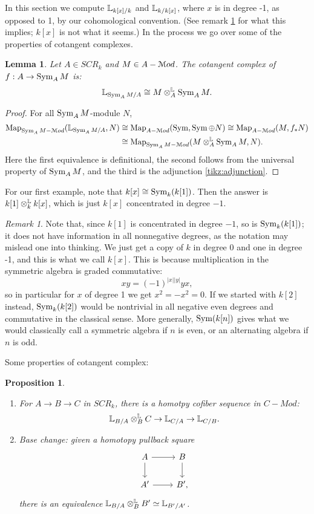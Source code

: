 \documentclass[10pt,a4paper,reqno,oneside]{book} %
\theoremstyle{plain}
\newtheorem{lem}[thm]{Lemma}
\newtheorem{prop}[thm]{Proposition}
\theoremstyle{definition}
\theoremstyle{remark}
\newtheorem{rem}[thm]{Remark}
\numberwithin{equation}{section}
\begin{document}
In this section we compute $\mathbb L_{k[x]/k}$ and $\mathbb L_{k/k[x]}$, where $x$ is in degree -1, as opposed to 1, by our 
cohomological convention. (See remark \ref{rem:degree_convention} for what this implies; $k[x]$ is not what it seems.)
In the process we go over some of the properties of cotangent complexes.

\begin{lem}
Let $A \in SCR_k$ and $M \in A-\mathcal M od$. The cotangent complex of $f: A \to \operatorname{Sym}_A M$ is:
\[	\mathbb L_{\operatorname{Sym}_A M /A}\cong M \otimes^{\mathbb L}_A \operatorname{Sym}_A M .	\]
\end{lem}
\begin{proof}
For all $\operatorname{Sym}_A M$-module $N$,
\begin{align*}
	\operatorname{Map}_{\operatorname{Sym}_A M -\mathcal M od}(\mathbb L_{\operatorname{Sym}_A M/A}, N) &\cong \operatorname{Map}_{A-\mathcal M od}(\operatorname{Sym}, \operatorname{Sym}\oplus N ) \cong \operatorname{Map}_{A-\mathcal M od}(M, f_* N) \\
&\cong \operatorname{Map}_{\operatorname{Sym}_A M - \mathcal M od}(M \otimes^{\mathbb L}_A \operatorname{Sym}_A M ,N).
\end{align*}
Here the first equivalence is definitional, the second follows from the universal property of $\operatorname{Sym}_A M$, and the third is
the adjunction \ref{tikz:adjunction}.
\end{proof}

For our first example, note that $k[x] \cong \operatorname{Sym}_k(k[1])$. Then the answer is $k[1] \otimes^{\mathbb L}_k k[x]$, which is just 
$k[x]$ concentrated in degree $-1$.

\begin{rem}
\label{rem:degree_convention}
Note that, since $k[1]$ is concentrated in degree $-1$, so is $\operatorname{Sym}_k(k[1])$; it does not have information in all 
nonnegative degrees, as the notation may mislead one into thinking. We just get a copy of $k$ in degree 0 and one
in degree -1,
and this is what we call $k[x]$. This is because multiplication in the symmetric algebra is graded commutative:
\[	x y = (-1)^{|x||y|} yx,	\]
so in particular for $x$ of degree 1 we get $x^2 = -x^2 = 0$. If we started with $k[2]$ instead,
$\operatorname{Sym}_k(k[2])$ would be nontrivial in all negative even degrees and commutative in the classical sense. More generally, 
$\operatorname{Sym}(k[n])$ gives what we would classically
call a symmetric algebra if $n$ is even, or an alternating algebra if $n$ is odd.
\end{rem}

Some properties of cotangent complex:
\begin{prop}
\;
\begin{enumerate}
\item For $A \to B \to C$ in $SCR_k$, there is a homotpy cofiber sequence in $C-Mod$:
\[	\mathbb L_{B/A} \otimes^{\mathbb L}_B C \to \mathbb L_{C/A} \to \mathbb L_{C/B}.	\]
\item Base change: given a homotopy pullback square
\[
\begin{tikzcd}
A\arrow{r}\arrow{d} & B\arrow{d} \\
A'\arrow{r} & B',
\end{tikzcd}
\]
there is an equivalence $\mathbb L_{B/A} \otimes^{\mathbb L}_B B' \simeq \mathbb L_{B'/A'}$.
\end{enumerate}
\end{prop}
\end{document}
